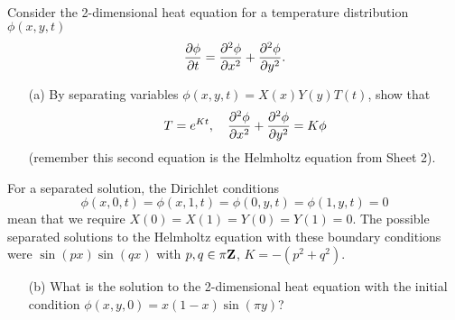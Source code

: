 \documentclass[12pt]{article}
\begin{document}
\iffalse
\begin{answer}
The factors of separated solutions $X(x)T(t)$ obey the ODEs $X''=-\lambda X$, $T''=-\lambda T$. Thus
\[X=\begin{cases}
A\sin(px)+B\cos(px)&\mbox{ if }\lambda=p^2>0\\
Ax+B&\mbox{ if }\lambda=0\\
A\sinh(px)+B\cosh(px)&\mbox{ if }\lambda=-p^2<0.
\end{cases}\]
Case 1: $\lambda=p^2$. Setting $X(0)=0$ gives $B=0$. Setting $X'(1)=0$ gives $p=\left(n+\frac{1}{2}\right)\pi$.

Case 2: $\lambda=0$. Setting $X(0)=0$ gives $B=0$. Setting $X'(1)=0$ gives $A=0$.

Case 3: $\lambda=-p^2$. Setting $X(0)=0$ gives $B=0$. Setting $X'(1)=0$ gives $A=0$.

Thus the nontrivial solutions are $\cos\left(\left(n+\frac{1}{2}\right)\pi x\right)$.

We make an Ansatz for the solution of the form
\[\phi(x,t)=\sum_{n=0}^{\infty}\cos\left(\left(n+\frac{1}{2}\right)\pi x\right)\left(A_n\sin\left(\left(n+\frac{1}{2}\right)\pi t\right)+B_n\cos\left(\left(n+\frac{1}{2}\right)\pi t\right)\right).\]
Setting $t=0$ gives
\[\phi(x,0)=\sum B_n\cos\left(\left(n+\frac{1}{2}\right)\pi x\right)\]
which equals $\cos(x\pi/2)$ by the initial condition, so the only nonvanishing term is $B_0=1$. Differentiating the Ansatz with respect to $t$ and setting $t=0$ gives
\[\pd{\phi}{t}(x,0)=\sum A_n\left(n+\frac{1}{2}\right)\pi\cos\left(\left(n+\frac{1}{2}\right)\pi x\right)=0\]
which tells us that $A_n=0$ for all $n$. Therefore the solution is
\[\phi(x,t)=\cos(\pi x/2)\cos(\pi t/2).\]
\end{answer}
\newpage
\fi
\bigskip

\begin{question}\ \\
Consider the 2-dimensional heat equation for a temperature distribution $\phi(x,y,t)$
\[\dfrac{\partial \phi}{\partial t}=\dfrac{\partial^2 \phi}{\partial x^2}+\dfrac{\partial^2 \phi}{\partial y^2}.\]
\begin{enumerate}
\item[(a)] By separating variables $\phi(x,y,t)=X(x)Y(y)T(t)$, show that
\[T=e^{Kt},\quad\dfrac{\partial^2 \phi}{\partial x^2}+\dfrac{\partial^2 \phi}{\partial y^2}=K\phi\]
(remember this second equation is the Helmholtz equation from Sheet 2).
\end{enumerate}
For a separated solution, the Dirichlet conditions
\[\phi(x,0,t)=\phi(x,1,t)=\phi(0,y,t)=\phi(1,y,t)=0\]
mean that we require $X(0)=X(1)=Y(0)=Y(1)=0$. The possible separated solutions to the Helmholtz equation with these boundary conditions were $\sin(px)\sin(qx)$ with $p,q\in\pi\mathbf{Z}$, $K=-(p^2+q^2)$.
\begin{enumerate}
\item[(b)] What is the solution to the 2-dimensional heat equation with the initial condition $\phi(x,y,0)=x(1-x)\sin(\pi y)$?
\end{enumerate}
\end{question}
\end{document}
